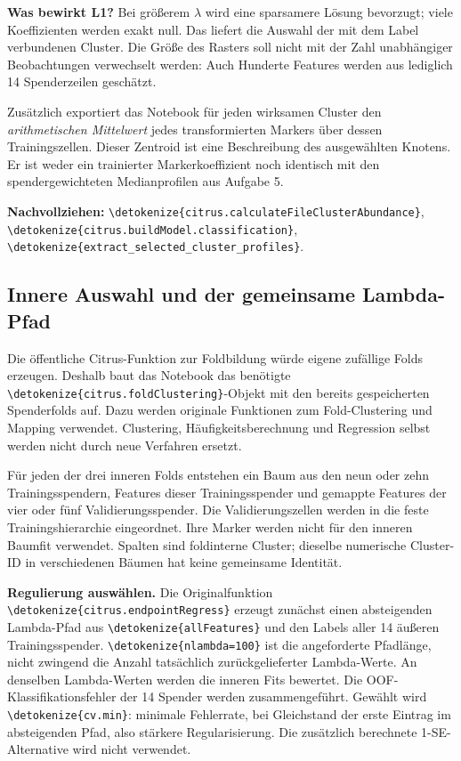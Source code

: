 \documentclass[11pt,a4paper]{article}
\newcommand{\code}[1]{\expandafter\nolinkurl\expandafter{\detokenize{#1}}}
\newcommand{\source}[1]{\par{\footnotesize\raggedright\color{muted}\textbf{Nachvollziehen:} #1\par}}
\begin{document}
\textbf{Was bewirkt L1?} Bei größerem \(\lambda\) wird eine sparsamere
Lösung bevorzugt; viele Koeffizienten werden exakt null. Das liefert die
Auswahl der mit dem Label verbundenen Cluster. Die Größe des Rasters
soll nicht mit der Zahl unabhängiger Beobachtungen verwechselt werden:
Auch Hunderte Features werden aus lediglich 14 Spenderzeilen geschätzt.

Zusätzlich exportiert das Notebook für jeden wirksamen Cluster den
\emph{arithmetischen Mittelwert} jedes transformierten Markers über dessen
Trainingszellen. Dieser Zentroid ist eine Beschreibung des ausgewählten
Knotens. Er ist weder ein trainierter Markerkoeffizient noch identisch mit
den spendergewichteten Medianprofilen aus Aufgabe 5.
\source{\code{citrus.calculateFileClusterAbundance},
\code{citrus.buildModel.classification}, \code{extract_selected_cluster_profiles}.}

\clearpage
\subsection*{Innere Auswahl und der gemeinsame Lambda-Pfad}\label{sec:citruslambda}
Die öffentliche Citrus-Funktion zur Foldbildung würde eigene zufällige
Folds erzeugen. Deshalb baut das Notebook das benötigte
\code{citrus.foldClustering}-Objekt mit den bereits gespeicherten
Spenderfolds auf. Dazu werden originale Funktionen zum Fold-Clustering
und Mapping verwendet. Clustering, Häufigkeitsberechnung und Regression
selbst werden nicht durch neue Verfahren ersetzt.

Für jeden der drei inneren Folds entstehen ein Baum aus den neun oder zehn
Trainingsspendern, Features dieser Trainingsspender und gemappte Features
der vier oder fünf Validierungsspender. Die Validierungszellen werden in
die feste Trainingshierarchie eingeordnet. Ihre Marker werden nicht für
den inneren Baumfit verwendet. Spalten sind foldinterne Cluster; dieselbe
numerische Cluster-ID in verschiedenen Bäumen hat keine gemeinsame Identität.

\textbf{Regulierung auswählen.} Die Originalfunktion
\code{citrus.endpointRegress} erzeugt zunächst einen absteigenden
Lambda-Pfad aus \code{allFeatures} und den Labels aller 14 äußeren
Trainingsspender. \code{nlambda=100} ist die angeforderte Pfadlänge,
nicht zwingend die Anzahl tatsächlich zurückgelieferter Lambda-Werte.
An denselben Lambda-Werten werden die inneren Fits bewertet. Die
OOF-Klassifikationsfehler der 14 Spender werden zusammengeführt.
Gewählt wird \code{cv.min}: minimale Fehlerrate, bei Gleichstand der
erste Eintrag im absteigenden Pfad, also stärkere Regularisierung.
Die zusätzlich berechnete 1-SE-Alternative wird nicht verwendet.
\end{document}
